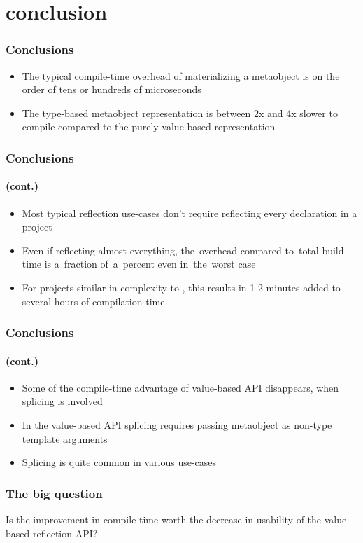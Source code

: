 \documentclass[compress,table,xcolor=table]{beamer}
\begin{document}
\section{conclusion}
\begin{frame}
  \frametitle{Conclusions}
  \Large
  \begin{itemize}
    \item The typical compile-time overhead of materializing a metaobject
      is on the order of tens or hundreds of microseconds
    \item The type-based metaobject representation is between 2x and 4x
      slower to compile compared to the purely value-based representation
  \end{itemize}
\end{frame}
\begin{frame}
  \frametitle{Conclusions}
  \framesubtitle{(cont.)}
  \Large
  \begin{itemize}
    \item Most typical reflection use-cases don't require reflecting every
      declaration in a project
    \item Even if reflecting almost everything, the~overhead compared
      to~total build time is a~fraction of~a~percent even in~the~worst case
    \item For projects similar in complexity to ,
      this results in 1-2 minutes added to several hours of compilation-time
  \end{itemize}
\end{frame}
\begin{frame}
  \frametitle{Conclusions}
  \framesubtitle{(cont.)}
  \Large
  \begin{itemize}
    \item Some of the compile-time advantage of value-based API disappears,
      when splicing is involved
    \item In the value-based API splicing requires passing metaobject
      as non-type template arguments
    \item Splicing is quite common in various use-cases
  \end{itemize}
\end{frame}
\begin{frame}
  \frametitle{The {\larger big} question}
  \Large
  \centering
  Is the improvement in compile-time worth the decrease in usability
  of the value-based reflection API?
\end{frame}
\end{document}
